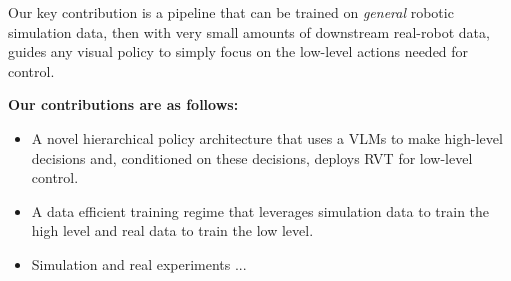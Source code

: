 Our key contribution is a pipeline that can be trained on \emph{general} robotic simulation data, then with very small amounts of downstream real-robot data, guides any visual policy to simply focus on the low-level actions needed for control.

\textbf{Our contributions are as follows:}
\begin{itemize}
    \item A novel hierarchical policy architecture that uses a VLMs to make high-level decisions and, conditioned on these decisions, deploys RVT for low-level control.
    \item A data efficient training regime that leverages simulation data to train the high level and real data to train the low level.
    \item Simulation and real experiments ...
\end{itemize}